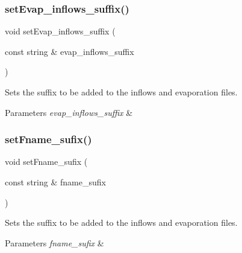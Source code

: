 \subsubsection{\texorpdfstring{set\+Evap\+\_\+inflows\+\_\+suffix()}{setEvap\_inflows\_suffix()}}
{\footnotesize\ttfamily void set\+Evap\+\_\+inflows\+\_\+suffix (\begin{DoxyParamCaption}\item[{const string \&}]{evap\+\_\+inflows\+\_\+suffix }\end{DoxyParamCaption})}



Sets the suffix to be added to the inflows and evaporation files. 


\begin{DoxyParams}{Parameters}
{\em evap\+\_\+inflows\+\_\+suffix} & \\
\hline
\end{DoxyParams}
\mbox{\label{classProblem_abc968bcab1302a525cfa5a7f570fc326_abc968bcab1302a525cfa5a7f570fc326}} 
\subsubsection{\texorpdfstring{set\+Fname\+\_\+sufix()}{setFname\_sufix()}}
{\footnotesize\ttfamily void set\+Fname\+\_\+sufix (\begin{DoxyParamCaption}\item[{const string \&}]{fname\+\_\+sufix }\end{DoxyParamCaption})}



Sets the suffix to be added to the inflows and evaporation files. 


\begin{DoxyParams}{Parameters}
{\em fname\+\_\+sufix} & \\
\hline
\end{DoxyParams}
\mbox{\label{classProblem_a4af40eab4f22f8754066410f7088b9db_a4af40eab4f22f8754066410f7088b9db}} 
